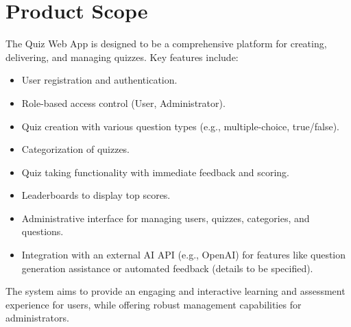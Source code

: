 \section{Product Scope}
\label{sec:ProductScope}
The Quiz Web App is designed to be a comprehensive platform for creating, delivering, and managing quizzes. Key features include:
\begin{itemize}
    \item User registration and authentication.
    \item Role-based access control (User, Administrator).
    \item Quiz creation with various question types (e.g., multiple-choice, true/false).
    \item Categorization of quizzes.
    \item Quiz taking functionality with immediate feedback and scoring.
    \item Leaderboards to display top scores.
    \item Administrative interface for managing users, quizzes, categories, and questions.
    \item Integration with an external AI API (e.g., OpenAI) for features like question generation assistance or automated feedback (details to be specified).
\end{itemize}
The system aims to provide an engaging and interactive learning and assessment experience for users, while offering robust management capabilities for administrators.


